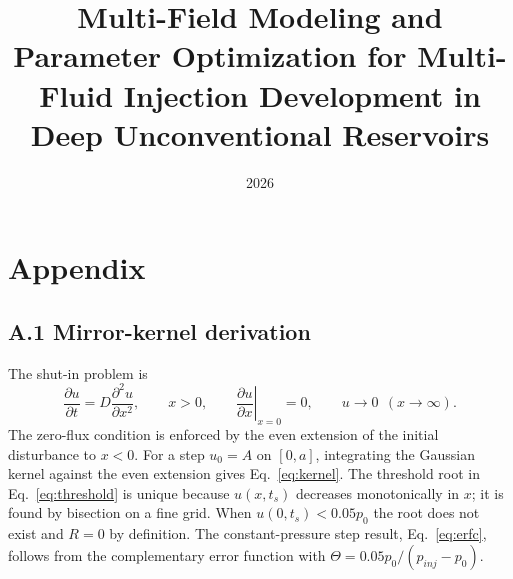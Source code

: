 \documentclass{swmcmthesis}
\title{Multi-Field Modeling and Parameter Optimization for Multi-Fluid Injection Development in Deep Unconventional Reservoirs}
\date{2026}
\begin{document}
\ifPDFTeX\else
  \normalfont
\fi

\graphicspath{{figures/}}

\maketitle
\tableofcontents

\newpage











\label{LastMainPage}

\clearpage
\pagestyle{plain}


\newpage
\pagestyle{plain}
\section*{Appendix}
\subsection*{A.1 Mirror-kernel derivation}

The shut-in problem is
\begin{equation}
\frac{\partial u}{\partial t}=D\frac{\partial^2u}{\partial x^2},
\qquad x>0,\qquad
\left.\frac{\partial u}{\partial x}\right|_{x=0}=0,\qquad u\to0\ \ (x\to\infty).
\end{equation}
The zero-flux condition is enforced by the even extension of the initial
disturbance to $x<0$. For a step $u_0=A$ on $[0,a]$, integrating the Gaussian
kernel against the even extension gives Eq.~\eqref{eq:kernel}. The threshold
root in Eq.~\eqref{eq:threshold} is unique because $u(x,t_s)$ decreases
monotonically in $x$; it is found by bisection on a fine grid. When
$u(0,t_s)<0.05p_0$ the root does not exist and $R=0$ by definition. The
constant-pressure step result, Eq.~\eqref{eq:erfc}, follows from the
complementary error function with $\Theta=0.05p_0/(p_{inj}-p_0)$.
\end{document}
